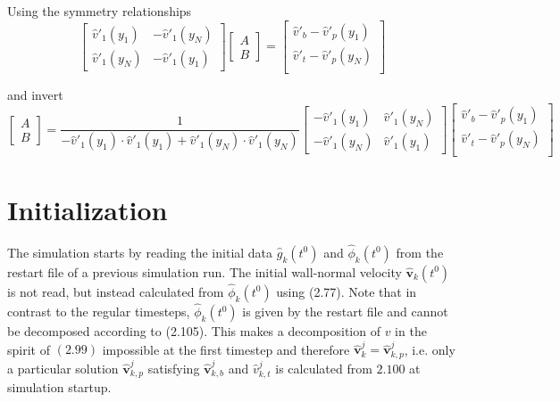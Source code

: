 \documentclass[titlepage,12pt,letter]{article}
\numberwithin{equation}{section}
\begin{document}
Using the symmetry relationships
\begin{equation*}
	\renewcommand{\arraystretch}{2}
	\begin{bmatrix}
		\hat{v}'_1\left(y_{1}\right) & -\hat{v}'_1\left(y_{N}\right) \\
		\hat{v}'_1\left(y_{N}\right) & -\hat{v}'_1\left(y_{1}\right)
	\end{bmatrix}
	\begin{bmatrix}
		A\\ B
	\end{bmatrix}
	=
	\begin{bmatrix}
		\hat{v}'_b-\hat{v}'_p\left(y_{1}\right) \\
		\hat{v}'_t-\hat{v}'_p\left(y_{N}\right) \\
	\end{bmatrix}
\end{equation*}

and invert
\begin{equation}
	\renewcommand{\arraystretch}{2}
	\begin{bmatrix}
		A\\ B
	\end{bmatrix}
	=\frac{1}{-\hat{v}'_1(y_1)\cdot \hat{v}'_1(y_1)+ \hat{v}'_1(y_N)\cdot \hat{v}'_1(y_N)}
	\begin{bmatrix}
		-\hat{v}'_1\left(y_{1}\right)& \hat{v}'_1\left(y_{N}\right) \\
		-\hat{v}'_1\left(y_{N}\right) &	\hat{v}'_1\left(y_{1}\right) 
	\end{bmatrix}
	\begin{bmatrix}
	\hat{v}'_b-\hat{v}'_p\left(y_{1}\right) \\
	\hat{v}'_t-\hat{v}'_p\left(y_{N}\right) \\
\end{bmatrix} \label{eq:AB}
\end{equation}


\section{Initialization}

The simulation starts by reading the initial data $\hat{g}_{k}\left(t^{0}\right)$ and $\hat{\phi}_{k}\left(t^{0}\right)$ from the restart file of a previous simulation run. The initial wall-normal velocity $\hat{\bm{v}}_{k}\left(t^{0}\right)$ is not read, but instead calculated from $\hat{\phi}_{k}\left(t^{0}\right)$ using (2.77). Note that in contrast to the regular timesteps, $\hat{\phi}_{k}\left(t^{0}\right)$ is given by the restart file and cannot be decomposed according to (2.105). This makes a decomposition of $v$ in the spirit of $(2.99)$ impossible at the first timestep and therefore $\hat{\bm{v}}_{k}^{j}=\hat{\bm{v}}_{k, p}^{j}$, i.e. only a particular solution $\hat{\bm{v}}_{k, p}^{j}$ satisfying $\hat{\bm{v}}_{k, b}^{j}$ and $\hat{v}_{k, t}^{j}$ is calculated from $2.100$ at simulation startup.
\end{document}
